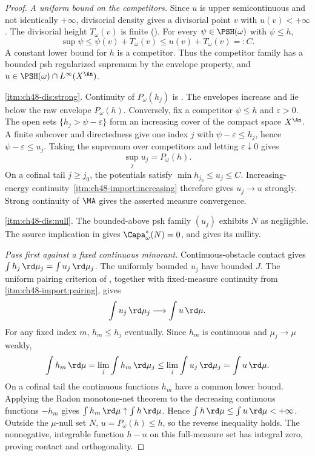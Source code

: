 \begin{proof}
\emph{A uniform bound on the competitors.}
Since $u$ is upper semicontinuous and not identically $+\infty$,
divisorial density gives a divisorial point $v$ with $u(v)<+\infty$.
The divisorial height $T_\omega(v)$ is finite
().
For every $\psi\in\PSH(\omega)$ with $\psi\le h$,
\[
 \sup\psi\le\psi(v)+T_\omega(v)\le u(v)+T_\omega(v)=:C.
\]
A constant lower bound for $h$ is a competitor. Thus the competitor
family has a bounded psh regularized supremum by the envelope property,
and $u\in\PSH(\omega)\cap L^\infty(X^{\An})$.

\cref{itm:ch48-dis:strong}.
Continuity of $P_\omega(h_j)$ is
. The envelopes increase and lie
below the raw envelope $P_\omega(h)$.
Conversely, fix a competitor $\psi\le h$ and $\varepsilon>0$.
The open sets $\{h_j>\psi-\varepsilon\}$ form an increasing cover of
the compact space $X^{\An}$. A finite subcover and directedness give
one index $j$ with $\psi-\varepsilon\le h_j$, hence
$\psi-\varepsilon\le u_j$. Taking the supremum over competitors and
letting $\varepsilon\downarrow0$ gives
\[
                  \sup_j u_j=P_\omega(h).
\]
On a cofinal tail $j\ge j_0$, the potentials satisfy
$\min h_{j_0}\le u_j\le C$. Increasing-energy continuity
\,\cref{itm:ch48-import:increasing}
therefore gives $u_j\to u$ strongly.
Strong continuity of $\MA$ gives the asserted measure convergence.

\cref{itm:ch48-dis:null}.
The bounded-above psh family $(u_j)$ exhibits $N$ as negligible.
The source implication in 
gives $\Capa^*_\omega(N)=0$, and
 gives its nullity.

\emph{Pass first against a fixed continuous minorant.}
Continuous-obstacle contact gives
$\int h_j\,\rd\mu_j=\int u_j\,\rd\mu_j$.
The uniformly bounded $u_j$ have bounded $J$.
The uniform pairing criterion of ,
together with fixed-measure continuity from
\,\cref{itm:ch48-import:pairing}, gives
\[
                    \int u_j\,\rd\mu_j\longrightarrow\int u\,\rd\mu.
\]
For any fixed index $m$, $h_m\le h_j$ eventually. Since $h_m$ is
continuous and $\mu_j\to\mu$ weakly,
\[
 \int h_m\,\rd\mu
   =\lim_j\int h_m\,\rd\mu_j
   \le\lim_j\int u_j\,\rd\mu_j
   =\int u\,\rd\mu.
\]
On a cofinal tail the continuous functions $h_m$ have a common lower
bound. Applying the Radon monotone-net theorem
 to the decreasing continuous functions
$-h_m$ gives $\int h_m\,\rd\mu\uparrow\int h\,\rd\mu$.
Hence $\int h\,\rd\mu\le\int u\,\rd\mu<+\infty$.
Outside the $\mu$-null set $N$, $u=P_\omega(h)\le h$, so the reverse
inequality holds. The nonnegative, integrable function $h-u$ on this
full-measure set has integral zero, proving contact and orthogonality.
\end{proof}

